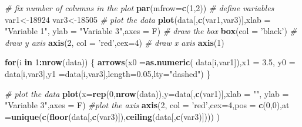 \documentclass[
]{book}
\newenvironment{Shaded}{\begin{snugshade}}{\end{snugshade}}
\newcommand{\CommentTok}[1]{\textcolor[rgb]{0.56,0.35,0.01}{\textit{#1}}}
\newcommand{\ControlFlowTok}[1]{\textcolor[rgb]{0.13,0.29,0.53}{\textbf{#1}}}
\newcommand{\DataTypeTok}[1]{\textcolor[rgb]{0.13,0.29,0.53}{#1}}
\newcommand{\DecValTok}[1]{\textcolor[rgb]{0.00,0.00,0.81}{#1}}
\newcommand{\FloatTok}[1]{\textcolor[rgb]{0.00,0.00,0.81}{#1}}
\newcommand{\KeywordTok}[1]{\textcolor[rgb]{0.13,0.29,0.53}{\textbf{#1}}}
\newcommand{\NormalTok}[1]{#1}
\newcommand{\OperatorTok}[1]{\textcolor[rgb]{0.81,0.36,0.00}{\textbf{#1}}}
\newcommand{\StringTok}[1]{\textcolor[rgb]{0.31,0.60,0.02}{#1}}
\theoremstyle{definition}
\theoremstyle{definition}
\theoremstyle{definition}
\theoremstyle{remark}
\begin{document}
\begin{Shaded}
\begin{Highlighting}[]
\CommentTok{# fix number of columns in the plot}
\KeywordTok{par}\NormalTok{(}\DataTypeTok{mfrow=}\KeywordTok{c}\NormalTok{(}\DecValTok{1}\NormalTok{,}\DecValTok{2}\NormalTok{))}
\CommentTok{# define variables}
\NormalTok{var1<-}\DecValTok{18924}
\NormalTok{var3<-}\DecValTok{18505}
\CommentTok{# plot the data}
\KeywordTok{plot}\NormalTok{(data[,}\KeywordTok{c}\NormalTok{(var1,var3)],}\DataTypeTok{xlab =} \StringTok{"Variable 1"}\NormalTok{, }\DataTypeTok{ylab =} \StringTok{"Variable 3"}\NormalTok{,}\DataTypeTok{axes =}\NormalTok{ F)}
\CommentTok{# draw the box}
\KeywordTok{box}\NormalTok{(}\DataTypeTok{col =} \StringTok{'black'}\NormalTok{)}
\CommentTok{# draw y axis}
\KeywordTok{axis}\NormalTok{(}\DecValTok{2}\NormalTok{, }\DataTypeTok{col =} \StringTok{'red'}\NormalTok{,}\DataTypeTok{cex=}\DecValTok{4}\NormalTok{)}
\CommentTok{# draw x axis}
\KeywordTok{axis}\NormalTok{(}\DecValTok{1}\NormalTok{)}

\ControlFlowTok{for}\NormalTok{(i }\ControlFlowTok{in} \DecValTok{1}\OperatorTok{:}\KeywordTok{nrow}\NormalTok{(data))}
\NormalTok{\{}
  \KeywordTok{arrows}\NormalTok{(}\DataTypeTok{x0 =}\KeywordTok{as.numeric}\NormalTok{( data[i,var1]),}\DataTypeTok{x1 =}  \FloatTok{3.5}\NormalTok{,}
           \DataTypeTok{y0 =}\NormalTok{ data[i,var3],}\DataTypeTok{y1 =}\NormalTok{data[i,var3],}\DataTypeTok{length=}\FloatTok{0.05}\NormalTok{,}\DataTypeTok{lty=}\StringTok{"dashed"}\NormalTok{)}
\NormalTok{\}}

\CommentTok{# plot the data}
\KeywordTok{plot}\NormalTok{(}\DataTypeTok{x=}\KeywordTok{rep}\NormalTok{(}\DecValTok{0}\NormalTok{,}\KeywordTok{nrow}\NormalTok{(data)),}\DataTypeTok{y=}\NormalTok{data[,}\KeywordTok{c}\NormalTok{(var1)],}\DataTypeTok{xlab =} \StringTok{""}\NormalTok{, }\DataTypeTok{ylab =} \StringTok{"Variable 3"}\NormalTok{,}\DataTypeTok{axes =}\NormalTok{ F)}
\CommentTok{#plot the axis}
\KeywordTok{axis}\NormalTok{(}\DecValTok{2}\NormalTok{, }\DataTypeTok{col =} \StringTok{'red'}\NormalTok{,}\DataTypeTok{cex=}\DecValTok{4}\NormalTok{,}\DataTypeTok{pos =} \KeywordTok{c}\NormalTok{(}\DecValTok{0}\NormalTok{,}\DecValTok{0}\NormalTok{),}\DataTypeTok{at =}\KeywordTok{unique}\NormalTok{(}\KeywordTok{c}\NormalTok{(}\KeywordTok{floor}\NormalTok{(data[,}\KeywordTok{c}\NormalTok{(var3)]),}\KeywordTok{ceiling}\NormalTok{(data[,}\KeywordTok{c}\NormalTok{(var3)]))) )}
\end{Highlighting}
\end{Shaded}
\end{document}
